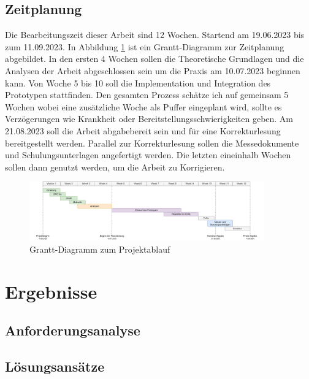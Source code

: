 \documentclass[a4paper, 12pt, oneside]{scrbook}
\begin{document}
	\section{Zeitplanung}
	
	Die Bearbeitungszeit dieser Arbeit sind 12 Wochen. Startend am 19.06.2023 bis zum 11.09.2023. In Abbildung \ref{fig:Grantt} ist ein Grantt-Diagramm zur Zeitplanung abgebildet. In den ersten 4 Wochen sollen die Theoretische Grundlagen und die Analysen der Arbeit abgeschlossen sein um die Praxis am 10.07.2023 beginnen kann. Von Woche 5 bis 10 soll die Implementation und Integration des Prototypen stattfinden. Den gesamten Prozess schätze ich auf gemeinsam 5 Wochen wobei eine zusätzliche Woche als Puffer eingeplant wird, sollte es Verzögerungen wie Krankheit oder Bereitstellungsschwierigkeiten geben. Am 21.08.2023 soll die Arbeit abgabebereit sein und für eine Korrekturlesung bereitgestellt werden. Parallel zur Korrekturlesung sollen die Messedokumente und Schulungsunterlagen angefertigt werden. Die letzten eineinhalb Wochen sollen dann genutzt werden, um die Arbeit zu Korrigieren.
	
	\begin{figure}[H]
		\centering
		\includegraphics[width=0.9\textwidth]{res/analysen/Grantt-Diagramm.pdf}
		\caption{Grantt-Diagramm zum Projektablauf}
		\label{fig:Grantt}
	\end{figure}
	
\chapter{Ergebnisse}\label{ch:Ergebnisse}
	
	
	\section{Anforderungsanalyse}
	
	\section{Lösungsansätze}
		
\end{document}
